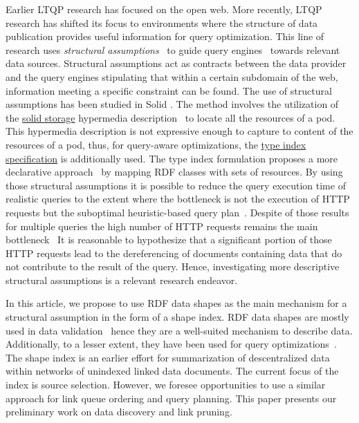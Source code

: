 Earlier LTQP research has focused on the open web.
More recently, LTQP research has shifted its focus to environments where the structure of data publication provides useful information for query optimization.
This line of research uses \emph{structural assumptions}~\cite{Taelman2023} to guide query engines~\cite{verborgh2020guided} towards relevant data sources.
Structural assumptions act as contracts between the data provider and the query engines stipulating that within a certain subdomain of the web, information meeting a specific constraint can be found.
The use of structural assumptions has been studied in Solid \cite{Taelman2023}.
The method involves the utilization of the 
\href{https://solidproject.org/TR/protocol#resources}{solid storage} hypermedia description~\cite{Fielding} to locate all the resources of a pod. 
This hypermedia description is not expressive enough to capture to content of the resources of a pod, thus, for query-aware optimizations, the \href{https://solid.github.io/type-indexes/}{type index specification} is additionally used.
The type index formulation proposes a more declarative approach~\cite{Taelman2017} by mapping RDF classes with sets of resources.
By using those structural assumptions it is possible to reduce the query execution time of realistic queries to the extent where the bottleneck is not the execution of HTTP requests but the suboptimal heuristic-based query plan~\cite{eschauzier_quweda_2023, Taelman2023}.
Despite of those results for multiple queries the high number of HTTP requests remains the main bottleneck~\cite{eschauzier_quweda_2023}
It is reasonable to hypothesize that a significant portion of those HTTP requests lead to the dereferencing of documents containing data that do not contribute to the result of the query.
Hence, investigating more descriptive structural assumptions is a relevant research endeavor.

In this article, we propose to use RDF data shapes as the main mechanism for a structural assumption in the form of a shape index.
RDF data shapes are mostly used in data validation~\cite{Gayo2018a} hence they are a well-suited mechanism to describe data.
Additionally, to a lesser extent, they have been used for query optimizations~\cite{kashif2021}.
The shape index is an earlier effort for summarization of descentralized data~\cite{Stuckenschmidt2004,Goldman1997, Harth2010} within networks of unindexed linked data documents.
The current focus of the index is source selection.
However, we foresee opportunities to use a similar approach for link queue ordering and query planning.
This paper presents our preliminary work on data discovery and link pruning.
